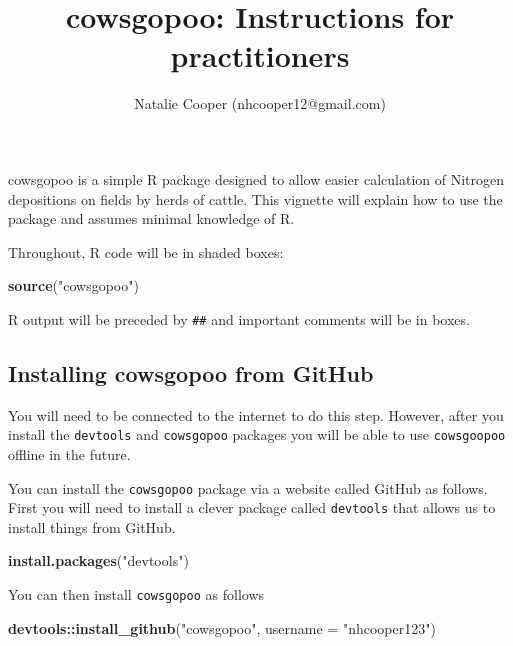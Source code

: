 \documentclass[12pt]{article}
\newcommand{\KeywordTok}[1]{\textcolor[rgb]{0.13,0.29,0.53}{\textbf{{#1}}}}
\newcommand{\DataTypeTok}[1]{\textcolor[rgb]{0.13,0.29,0.53}{{#1}}}
\newcommand{\StringTok}[1]{\textcolor[rgb]{0.31,0.60,0.02}{{#1}}}
\newcommand{\NormalTok}[1]{{#1}}
\begin{document}
\title{cowsgopoo: Instructions for practitioners}
\author{Natalie Cooper (nhcooper12@gmail.com)}
\date{}
\maketitle

cowsgopoo is a simple R package designed to allow easier calculation of Nitrogen depositions
on fields by herds of cattle. This vignette will explain how to use the package and assumes
minimal knowledge of R.

Throughout, R code will be in shaded boxes:

\begin{snugshade}
\begin{Highlighting}[]
\KeywordTok{source}\NormalTok{(}\StringTok{"cowsgopoo"}\NormalTok{)}
\end{Highlighting}
\end{snugshade}

R output will be preceded by \texttt{\#\#} and important comments will be in boxes.

\subsection{Installing cowsgopoo from GitHub}

\begin{framed}
You will need to be connected to the internet to do this step. However, after you install the \texttt{devtools} and \texttt{cowsgopoo} packages you will be able to use \texttt{cowsgoopoo} offline in the future.
\end{framed}

You can install the \texttt{cowsgopoo} package via a website called GitHub as follows. First you will need to install a clever package called \texttt{devtools} that allows us to install things from GitHub.

\begin{snugshade}
\begin{Highlighting}[]
\KeywordTok{install.packages}\NormalTok{(}\StringTok{"devtools"}\NormalTok{)}
\end{Highlighting}
\end{snugshade}

You can then install \texttt{cowsgopoo} as follows
\begin{snugshade}
\begin{Highlighting}[]
\KeywordTok{devtools::install_github}\NormalTok{(}\StringTok{"cowsgopoo"}\NormalTok{,} \DataTypeTok{username = }\StringTok{"nhcooper123"}\NormalTok{)}
\end{Highlighting}
\end{snugshade}
\end{document}
